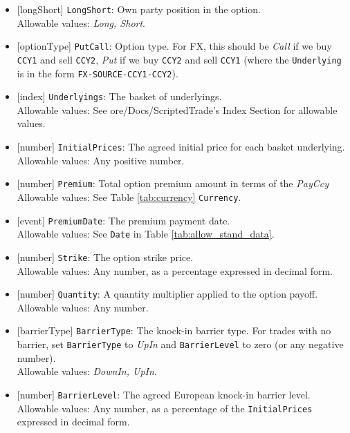 \begin{itemize} 
  \item{}[longShort] \lstinline!LongShort!: Own party position in the option. \\
  Allowable values: \emph{Long, Short}.
  \item{}[optionType] \lstinline!PutCall!: Option type. For FX, this should be \emph{Call} if we buy
  \lstinline!CCY1! and sell \lstinline!CCY2!,
  \emph{Put} if we buy \lstinline!CCY2! and sell \lstinline!CCY1! (where the \lstinline!Underlying! is in the
  form \lstinline!FX-SOURCE-CCY1-CCY2!). \\
  \item{}[index] \lstinline!Underlyings!: The basket of underlyings. \\
  Allowable values: See ore/Docs/ScriptedTrade's Index Section for allowable values.
  \item{}[number] \lstinline!InitialPrices!: The agreed initial price for each basket underlying. \\
  Allowable values: Any positive number.
  \item{}[number] \lstinline!Premium!: Total option premium amount in terms of the \emph{PayCcy} \\
  Allowable values: See Table \ref{tab:currency} \lstinline!Currency!.
  \item{}[event] \lstinline!PremiumDate!: The premium payment date. \\
  Allowable values: See \lstinline!Date! in Table \ref{tab:allow_stand_data}.
  \item{}[number] \lstinline!Strike!: The option strike price. \\
  Allowable values: Any number, as a percentage expressed in decimal form.
  \item{}[number] \lstinline!Quantity!: A quantity multiplier applied to the option payoff. \\
  Allowable values: Any number.
  \item{}[barrierType] \lstinline!BarrierType!: The knock-in barrier type. For trades with no barrier,
  set \lstinline!BarrierType! to \emph{UpIn} and \lstinline!BarrierLevel! to zero (or any negative number). \\
  Allowable values: \emph{DownIn, UpIn}.
  \item{}[number] \lstinline!BarrierLevel!: The agreed European knock-in barrier level. \\
  Allowable values: Any number, as a percentage of the \lstinline!InitialPrices! expressed in decimal form.

\end{itemize}
